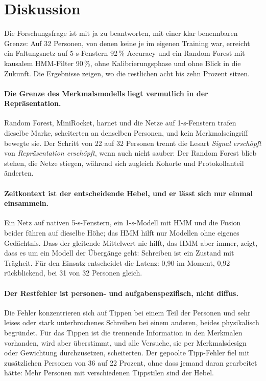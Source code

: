 \section{Diskussion}
\label{sec:discussion}

Die Forschungsfrage ist mit ja zu beantworten, mit einer klar benennbaren
Grenze: Auf 32 Personen, von denen keine je im eigenen Training war,
erreicht ein Faltungsnetz auf 5-s-Fenstern 92\,\% Accuracy und ein Random
Forest mit kausalem HMM-Filter 90\,\%, ohne Kalibrierungsphase und ohne
Blick in die Zukunft. Die Ergebnisse zeigen, wo die restlichen acht bis zehn
Prozent sitzen.

\paragraph{Die Grenze des Merkmalsmodells liegt vermutlich in der
Repräsentation.} Random Forest, MiniRocket, harnet und die Netze auf 1-s-Fenstern trafen
dieselbe Marke, scheiterten an denselben Personen, und kein Merkmalseingriff
bewegte sie. Der Schritt von 22 auf 32 Personen trennt die Lesart
\emph{Signal erschöpft} von \emph{Repräsentation erschöpft}, wenn auch nicht
sauber: Der Random Forest blieb stehen, die Netze stiegen, während sich
zugleich Kohorte und Protokollanteil änderten.

\paragraph{Zeitkontext ist der entscheidende Hebel, und er lässt sich nur
einmal einsammeln.} Ein Netz auf nativen 5-s-Fenstern, ein 1-s-Modell mit HMM und die Fusion
beider führen auf dieselbe Höhe; das HMM hilft nur Modellen ohne eigenes
Gedächtnis. Dass der gleitende Mittelwert nie hilft, das HMM aber immer,
zeigt, dass es um ein Modell der Übergänge geht: Schreiben ist ein Zustand
mit Trägheit. Für den Einsatz entscheidet die Latenz: 0,90 im Moment, 0,92
rückblickend, bei 31 von 32 Personen gleich.

\paragraph{Der Restfehler ist personen- und aufgabenspezifisch, nicht
diffus.} Die Fehler konzentrieren sich auf Tippen bei einem Teil der Personen und
sehr leises oder stark unterbrochenes Schreiben bei einem anderen, beides
physikalisch begründet. Für das Tippen ist die trennende Information in den
Merkmalen vorhanden, wird aber überstimmt, und alle Versuche, sie per
Merkmalsdesign oder Gewichtung durchzusetzen, scheiterten. Der gepoolte
Tipp-Fehler fiel mit zusätzlichen Personen von 36 auf 22 Prozent, ohne dass
jemand daran gearbeitet hätte: Mehr Personen mit verschiedenen Tippstilen
sind der Hebel.

